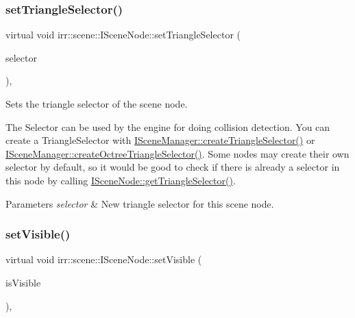 \subsubsection{\texorpdfstring{set\+Triangle\+Selector()}{setTriangleSelector()}\hspace{0.1cm}{\footnotesize\ttfamily [2/2]}}
{\footnotesize\ttfamily virtual void irr\+::scene\+::\+I\+Scene\+Node\+::set\+Triangle\+Selector (\begin{DoxyParamCaption}\item[{\hyperlink{classirr_1_1scene_1_1ITriangleSelector}{I\+Triangle\+Selector} $\ast$}]{selector }\end{DoxyParamCaption})\hspace{0.3cm}{\ttfamily [inline]}, {\ttfamily [virtual]}}



Sets the triangle selector of the scene node. 

The Selector can be used by the engine for doing collision detection. You can create a Triangle\+Selector with \hyperlink{classirr_1_1scene_1_1ISceneManager_a266625379b1558e9be1dc062ea4e71f7}{I\+Scene\+Manager\+::create\+Triangle\+Selector()} or \hyperlink{classirr_1_1scene_1_1ISceneManager_a4ed7d3b34f4d0c70395b6d464fe32b96}{I\+Scene\+Manager\+::create\+Octree\+Triangle\+Selector()}. Some nodes may create their own selector by default, so it would be good to check if there is already a selector in this node by calling \hyperlink{classirr_1_1scene_1_1ISceneNode_ab820f7ccfdd317d3913316b6991ea5d9}{I\+Scene\+Node\+::get\+Triangle\+Selector()}. 
\begin{DoxyParams}{Parameters}
{\em selector} & New triangle selector for this scene node. \\
\hline
\end{DoxyParams}
\mbox{\label{classirr_1_1scene_1_1ISceneNode_a2e3a88fe87d11caa7986a203afe6838c}} 
\subsubsection{\texorpdfstring{set\+Visible()}{setVisible()}\hspace{0.1cm}{\footnotesize\ttfamily [1/2]}}
{\footnotesize\ttfamily virtual void irr\+::scene\+::\+I\+Scene\+Node\+::set\+Visible (\begin{DoxyParamCaption}\item[{bool}]{is\+Visible }\end{DoxyParamCaption})\hspace{0.3cm}{\ttfamily [inline]}, {\ttfamily [virtual]}}



